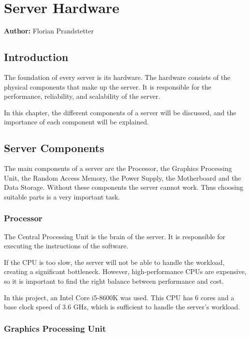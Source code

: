 \chapter{Server Hardware}
\label{chap:Server_Hardware}
\textbf{Author:} Florian Prandstetter

\section{Introduction}

The foundation of every server is its hardware. The hardware consists of the physical components that make up the server.
It is responsible for the performance, reliability, and scalability of the server.

In this chapter, the different components of a server will be discussed, and the importance of each component will be explained.

\section{Server Components}

The main components of a server are the Processor, the Graphics Processing Unit, the Random Access Memory, the Power Supply, the Motherboard and the Data Storage.
Without these components the server cannot work. Thus choosing suitable parts is a very important task.

\subsection{Processor}

The Central Processing Unit is the brain of the server. It is responsible for executing the instructions of the software. 

If the CPU is too slow, the server will not be able to handle the workload, creating a significant bottleneck. However, high-performance CPUs are expensive, so it is important to find the right balance between performance and cost.

In this project, an Intel Core i5-8600K was used. This CPU has 6 cores and a base clock speed of 3.6 GHz, which is sufficient to handle the server's workload.

\cite{CPU}
\cite{i5}

\subsection{Graphics Processing Unit}

